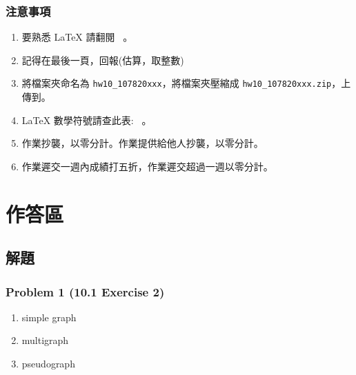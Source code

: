 \documentclass[12pt,hyperref={bookmarks=false}]{beamer}
\begin{document}
	\begin{frame}
	\frametitle{注意事項}
	\fontsize{10}{10pt}\selectfont
	\begin{enumerate}[label=(\alph*)]
	\item 要熟悉 LaTeX 請翻閱 \ 。
	\item 記得在最後一頁，回報\selectfont \color{red}{完成作業小時數}(估算，取整數)\selectfont \color{black}{。}
	\item 將檔案夾命名為 \texttt{hw10\_107820xxx}，將檔案夾壓縮成 \texttt{hw10\_107820xxx.zip}，上傳到。
	\item LaTeX 數學符號請查此表: \ 。
	\item 作業抄襲，以零分計。作業提供給他人抄襲，以零分計。
	\item 作業遲交一週內成績打五折，作業遲交超過一週以零分計。
	\end{enumerate}
	\end{frame}

\section{作答區}

	\subsection{解題}

	\begin{frame}
	\frametitle{Problem 1 (10.1 Exercise 2)}
	\fontsize{12}{16pt}\selectfont
	\begin{enumerate}[label=(\alph*)]
	\setlength\itemsep{0em}
	\item simple graph
	\item multigraph
	\item pseudograph
	\end{enumerate}
	\end{frame}
\end{document}
